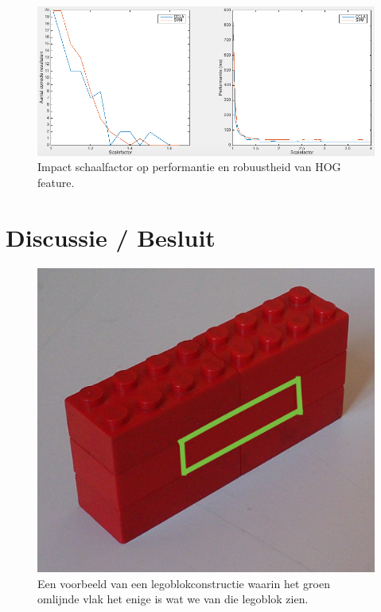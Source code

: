 \begin{figure}
  \centering
  \includegraphics[width=\linewidth]{img/scaleFact}
  \caption{Impact schaalfactor op performantie en robuustheid van HOG feature.}
  \label{fig:featScale}
\end{figure}




%

\section{Discussie / Besluit} \label{sec:besl_hfdst4}

\begin{figure}
  \centering
  \includegraphics[width=0.5\linewidth]{img/brickWall}
  \caption{Een voorbeeld van een legoblokconstructie waarin het groen omlijnde vlak het enige is wat we van die legoblok zien.}
  \label{fig:brickWall}
\end{figure}


